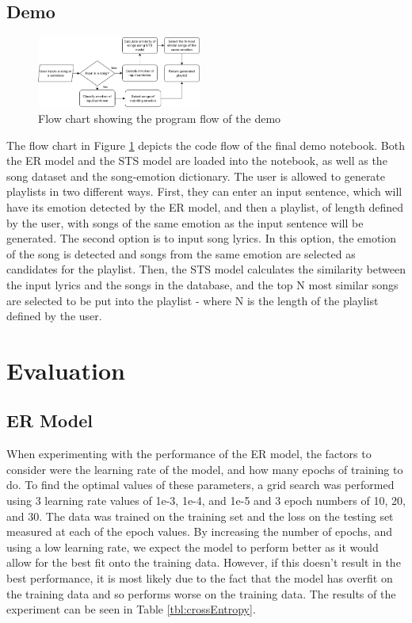 \documentclass[11pt]{article}
\begin{document}
\subsection{Demo}
\begin{figure}[H]
    \centering
    \includegraphics[width=0.48\textwidth]{images/DemoFlow.png}
    \caption{Flow chart showing the program flow of the demo}
    \label{fig:flow}
\end{figure}

The flow chart in Figure \ref{fig:flow} depicts the code flow of the final demo notebook. Both the ER model and the STS model are loaded into the notebook, as well as the song dataset and the song-emotion dictionary. The user is allowed to generate playlists in two different ways. First, they can enter an input sentence, which will have its emotion detected by the ER model, and then a playlist, of length defined by the user, with songs of the same emotion as the input sentence will be generated. The second option is to input song lyrics. In this option, the emotion of the song is detected and songs from the same emotion are selected as candidates for the playlist. Then, the STS model calculates the similarity between the input lyrics and the songs in the database, and the top N most similar songs are selected to be put into the playlist - where N is the length of the playlist defined by the user.

\section{Evaluation}

\subsection{ER Model}

When experimenting with the performance of the ER model, the factors to consider were the learning rate of the model, and how many epochs of training to do. To find the optimal values of these parameters, a grid search was performed using 3 learning rate values of 1e-3, 1e-4, and 1e-5 and 3 epoch numbers of 10, 20, and 30. The data was trained on the training set and the loss on the testing set measured at each of the epoch values. By increasing the number of epochs, and using a low learning rate, we expect the model to perform better as it would allow for the best fit onto the training data. However, if this doesn't result in the best performance, it is most likely due to the fact that the model has overfit on the training data and so performs worse on the training data. The results of the experiment can be seen in Table \ref{tbl:crossEntropy}.
\end{document}

